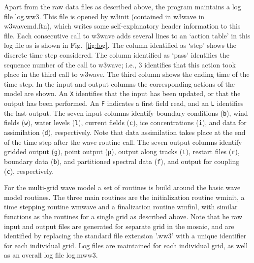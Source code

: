 Apart from the raw data files as described above, the program maintains a log
file {\file log.ww3}. This file is opened by {\F w3init} (contained in {\F
  w3wave} in {\file w3wavemd.ftn}), which writes some self-explanatory header
information to this file. Each consecutive call to {\F w3wave} adds several
lines to an `action table' in this log file as is shown in
Fig.~\ref{fig:log}. The column identified as `step' shows the discrete time
step considered. The column identified as `pass' identifies the sequence
number of the call to {\F w3wave}; i.e., 3 identifies that this action took
place in the third call to {\F w3wave}. The third column shows the ending time
of the time step. In the input and output columns the corresponding actions of
the model are shown. An {\tt X} identifies that the input has been updated, or
that the output has been performed. An {\tt F} indicates a first field read,
and an {\tt L} identifies the last output. The seven input columns identify
boundary conditions ({\tt b}), wind fields ({\tt w}), water levels ({\tt l}),
current fields ({\tt c}), ice concentrations ({\tt i}), and data for
assimilation ({\tt d}), respectively. Note that data assimilation takes place
at the end of the time step after the wave routine call. The seven output
columns identify gridded output ({\tt g}), point output ({\tt p}), output
along tracks ({\tt t}), restart files ({\tt r}), boundary data ({\tt b}), and
partitioned spectral data ({\tt f}), and output for coupling ({\tt c}),
respectively.

For the multi-grid wave model \citep[][{\file ww3\_multi}]{tol:OMOD08b} a set
of routines is build around the basic wave model routines. The three main
routines are the initialization routine {\F wminit}, a time stepping routine
{\F wmwave} and a finalization routine {\F wmfinl}, with similar functions as
the routines for a single grid as described above. Note that he raw input and
output files are generated for separate grid in the mosaic, and are identified
by replacing the standard file extension '{\file .ww3}' with a unique
identifier for each individual grid. Log files are maintained for each
individual grid, as well as an overall log file {\file log.mww3}.
